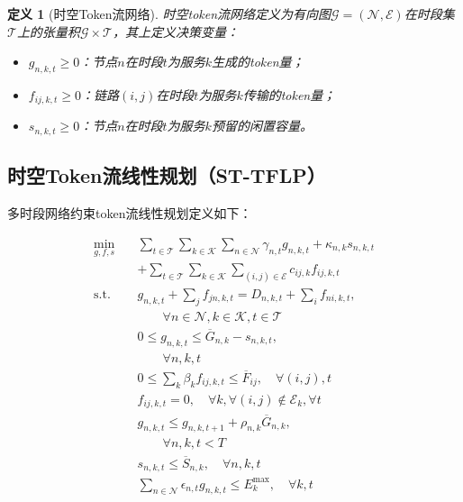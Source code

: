 \documentclass[11pt,a4paper,twocolumn]{article}
\newtheorem{definition}{定义}[section]
\begin{document}
\begin{definition}[时空Token流网络]
时空token流网络定义为有向图$\mathcal{G} = (\mathcal{N}, \mathcal{E})$在时段集$\mathcal{T}$上的张量积$\mathcal{G} \times \mathcal{T}$，其上定义决策变量：
\begin{itemize}[leftmargin=*]
\item $g_{n,k,t} \geq 0$：节点$n$在时段$t$为服务$k$生成的token量；
\item $f_{ij,k,t} \geq 0$：链路$(i,j)$在时段$t$为服务$k$传输的token量；
\item $s_{n,k,t} \geq 0$：节点$n$在时段$t$为服务$k$预留的闲置容量。
\end{itemize}
\end{definition}

\subsection{时空Token流线性规划（ST-TFLP）}

多时段网络约束token流线性规划定义如下：

\begin{align}
\min_{g,f,s} \quad & \sum_{t \in \mathcal{T}} \sum_{k \in \mathcal{K}} \sum_{n \in \mathcal{N}} \gamma_{n,t} g_{n,k,t} + \kappa_{n,k} s_{n,k,t} \nonumber\\
& + \sum_{t \in \mathcal{T}} \sum_{k \in \mathcal{K}} \sum_{(i,j) \in \mathcal{E}} c_{ij,k} f_{ij,k,t} \label{eq:st_tflp_obj}\\
\text{s.t.} \quad & g_{n,k,t} + \sum_{j} f_{jn,k,t} = D_{n,k,t} + \sum_{i} f_{ni,k,t}, \nonumber\\
& \qquad \forall n \in \mathcal{N}, k \in \mathcal{K}, t \in \mathcal{T} \label{eq:flow_balance}\\
& 0 \leq g_{n,k,t} \leq \overline{G}_{n,k} - s_{n,k,t}, \nonumber\\
& \qquad \forall n, k, t \label{eq:gen_cap}\\
& 0 \leq \sum_{k} \beta_k f_{ij,k,t} \leq \overline{F}_{ij}, \quad \forall (i,j), t \label{eq:line_cap}\\
& f_{ij,k,t} = 0, \quad \forall k, \forall (i,j) \notin \mathcal{E}_k, \forall t \label{eq:latency}
\\
& g_{n,k,t} \leq g_{n,k,t+1} + \rho_{n,k} \overline{G}_{n,k}, \nonumber\\
& \qquad \forall n, k, t < T \label{eq:ramp}\\
& s_{n,k,t} \leq \overline{S}_{n,k}, \quad \forall n, k, t \label{eq:spare_cap}\\
& \sum_{n \in \mathcal{N}} \epsilon_{n,t} g_{n,k,t} \leq E_k^{\max}, \quad \forall k, t \label{eq:carbon}
\end{align}
\end{document}

